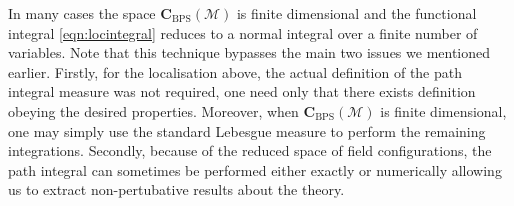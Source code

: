\documentclass[main.tex]{subfiles}
\begin{document}
In many cases the space $\mathbf{C}_{\text{BPS}}(\mathcal{M})$ is finite dimensional and the functional integral \eqref{eqn:locintegral} reduces to a normal integral over a finite number of variables.
Note that this technique bypasses the main two issues we mentioned earlier.  Firstly, for the localisation above, the actual definition of the path integral measure was not required, one need only that there exists  definition obeying the desired properties.  Moreover, when $\mathbf{C}_{\text{BPS}}(\mathcal{M})$ is finite dimensional, one may simply use the standard Lebesgue measure to perform the remaining integrations.
Secondly, because of the reduced space of field configurations, the path integral can sometimes be performed either exactly or numerically allowing us to extract non-pertubative results about the theory.
\end{document}
